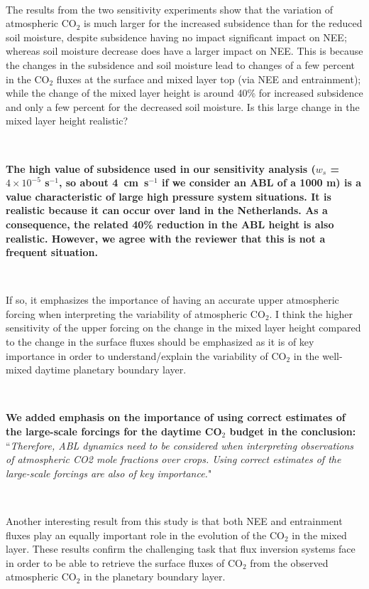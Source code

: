 \documentclass[10pt,a4paper,notitlepage,twoside]{article}
\begin{document}
\

The results from the two sensitivity experiments show that the 
variation of atmospheric CO$_2$ is
much larger for the increased subsidence than for the reduced soil moisture, despite subsidence
having no impact significant impact on NEE; whereas soil moisture decrease does have a larger
impact on NEE. This is because the changes in the subsidence and soil moisture lead to changes
of a few percent in the CO$_2$ fluxes at the surface and mixed layer top (via NEE and entrainment);
while the change of the mixed layer height is around 40\% for increased subsidence and only
a few percent for the decreased soil moisture. Is this large change in the mixed layer height
realistic?

\

\textbf{The high value of subsidence used in our sensitivity analysis ($w_s$ = $4 \times 10^{-5}$ s$^{-1}$, so about 4~cm~s$^{-1}$ if we consider an ABL of a 1000 m) is a value characteristic of large high pressure system situations. It is realistic because it can occur over land in the Netherlands. As a consequence, the related 40\% reduction in the ABL height is also realistic. However, we agree with the reviewer that this is not a frequent situation.} %

\

If so, it emphasizes the importance of having an accurate upper atmospheric forcing
when interpreting the variability of atmospheric CO$_2$. I think the higher sensitivity of the upper
forcing on the change in the mixed layer height compared to the change in the surface fluxes
should be emphasized as it is of key importance in order to understand/explain the variability
of CO$_2$ in the well-mixed daytime planetary boundary layer.

\

\textbf{We added emphasis on the importance of using correct estimates of the large-scale forcings for the daytime CO$_2$ budget in the conclusion:} ``\textit{Therefore, ABL dynamics need to be considered when interpreting observations of atmospheric CO2 mole fractions over crops. Using correct estimates of the large-scale forcings are also of key importance.}"

\

Another interesting result from this study is that both NEE and entrainment fluxes play an 
equally important role in the evolution of the CO$_2$ in the mixed layer. These results confirm
the challenging task that flux inversion systems face in order to be able to retrieve the surface
fluxes of CO$_2$ from the observed atmospheric CO$_2$ in the planetary boundary layer.
\end{document}
